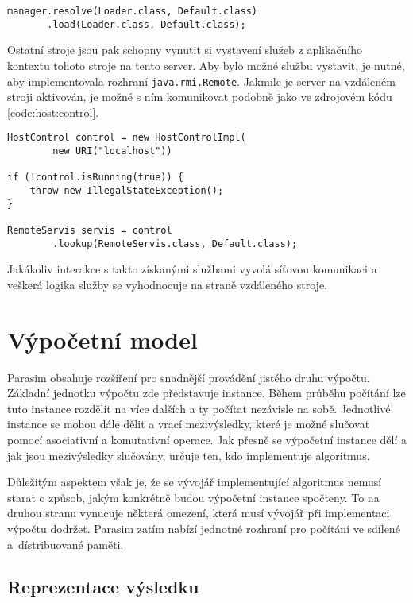 \begin{lstlisting}[label={code:remote}, caption={Spuštění serveru}, style=Java]
manager.resolve(Loader.class, Default.class)
	   .load(Loader.class, Default.class);
\end{lstlisting}
Ostatní stroje jsou pak schopny vynutit si vystavení služeb z aplikačního kontextu
tohoto stroje na tento server. Aby bylo možné službu vystavit, je nutné, aby implementovala
rozhraní \texttt{java.rmi.Remote}. Jakmile je server na vzdáleném stroji aktivován,
je možné s ním komunikovat podobně jako ve zdrojovém kódu \ref{code:host:control}.

\begin{lstlisting}[label={code:host:control}, caption={Přístup ke vzdálenému serveru}, style=Java]
HostControl control = new HostControlImpl(
		new URI("localhost"))

if (!control.isRunning(true)) {
	throw new IllegalStateException();
}

RemoteServis servis = control
		.lookup(RemoteServis.class, Default.class);
\end{lstlisting}

Jakákoliv interakce s takto získanými službami vyvolá síťovou komunikaci a veškerá logika
služby se vyhodnocuje na straně vzdáleného stroje.

\section{Výpočetní model}

Parasim obsahuje rozšíření pro snadnější provádění jistého druhu vý\-poč\-tu.
Základní jednotku výpočtu zde představuje instance. Během průběhu po\-čí\-tá\-ní lze
tuto instance rozdělit na více dalších a ty počítat nezávisle na sobě. Jednotlivé instance
se mohou dále dělit a vrací mezivýsledky, které je možné slučovat pomocí asociativní
a komutativní operace. Jak přesně se výpočetní instance dělí a jak jsou mezivýsledky
slučovány, určuje ten, kdo implementuje algoritmus.

Důležitým aspektem však je, že se vývojář implementující algoritmus nemusí starat
o způsob, jakým konkrétně budou výpočetní instance spočteny. To na druhou stranu vynucuje
některá omezení, která musí vývojář při implementaci výpočtu dodržet.  Parasim zatím nabízí
jednotné rozhraní pro počítání ve sdílené a~dís\-tri\-buo\-va\-né paměti.

\subsection{Reprezentace výsledku}

